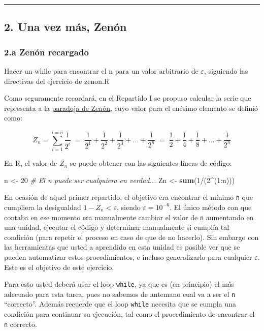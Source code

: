 \documentclass[]{article}
\newenvironment{Shaded}{}{}
\newcommand{\KeywordTok}[1]{\textcolor[rgb]{0.00,0.44,0.13}{\textbf{{#1}}}}
\newcommand{\DecValTok}[1]{\textcolor[rgb]{0.25,0.63,0.44}{{#1}}}
\newcommand{\CommentTok}[1]{\textcolor[rgb]{0.38,0.63,0.69}{\textit{{#1}}}}
\newcommand{\NormalTok}[1]{{#1}}
\begin{document}
\begin{center}\rule{3in}{0.4pt}\end{center}

\subsection{2. Una vez más, Zenón}

\subsubsection{2.a Zenón recargado}

Hacer un while para encontrar el n para un valor arbitrario de
$\varepsilon$, siguiendo las directivas del ejercicio de zenon.R

Como seguramente recordará, en el Repartido I se propuso calcular la
serie que representa a la
\href{https://es.wikipedia.org/wiki/Paradojas\_de\_Zen\%C3\%B3n\#La\_dicotom.C3.ADa}{paradoja
de Zenón}, cuyo valor para el enésimo elemento se definió como:

\[
  Z_n = \sum_{i=1}^{i=n} \frac{1}{2 ^ i} \;=\;
  \frac{1}{2 ^ 1} + \frac{1}{2 ^ 2} + \frac{1}{2 ^ 3} + ... + \frac{1}{2 ^ n} \;=\;
  \frac{1}{2} + \frac{1}{4} + \frac{1}{8} + ... + \frac{1}{2 ^ n}
\]

En R, el valor de $Z_n$ se puede obtener con las siguientes líneas de
código:

\begin{Shaded}
\begin{Highlighting}[]
\NormalTok{n <- }\DecValTok{20}  \CommentTok{# El n puede ser cualquiera en verdad...}
\NormalTok{Zn <- }\KeywordTok{sum}\NormalTok{(}\DecValTok{1}\NormalTok{/(}\DecValTok{2}\NormalTok{^(}\DecValTok{1}\NormalTok{:n)))}
\end{Highlighting}
\end{Shaded}
En ocasión de aquel primer repartido, el objetivo era encontrar el
mínimo \texttt{n} que cumpliera la desigualdad $1 - Z_n < \varepsilon$,
siendo $\varepsilon = 10 ^ {-6}$. El único método con que contaba en ese
momento era manualmente cambiar el valor de \texttt{n} aumentando en una
unidad, ejecutar el código y determinar manualmente si cumplía tal
condición (para repetir el proceso en caso de que de no hacerlo). Sin
embargo con las herramientas que usted a aprendido en esta unidad es
posible ver que se pueden automatizar estos procedimientos, e incluso
generalizarlo para cualquier $\varepsilon$. Este es el objetivo de este
ejercicio.

Para esto usted deberá usar el loop \texttt{while}, ya que es (en
principio) el más adecuado para esta tarea, pues no sabemos de antemano
cual va a ser el \texttt{n} ``correcto''. Además recuerde que el loop
\texttt{while} necesita que se cumpla una condición para continuar su
ejecución, tal como el procedimiento de encontrar el \texttt{n}
correcto.
\end{document}
